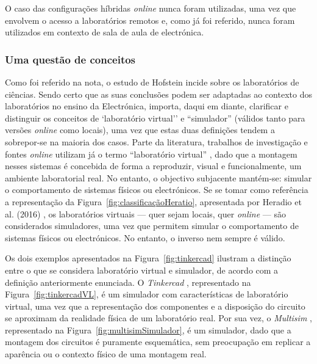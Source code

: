 O caso das configurações híbridas \textit{online} nunca foram utilizadas, uma vez que envolvem o acesso a laboratórios remotos e, como já foi referido, nunca foram utilizados  em contexto de sala de aula de electrónica.

\subsubsection{Uma questão de conceitos}
Como foi referido na nota, o estudo de Hofstein incide sobre os laboratórios de ciências. Sendo certo que as suas conclusões podem ser adaptadas ao contexto dos laboratórios no ensino da Electrónica, importa, daqui em diante, clarificar e distinguir os conceitos de `laboratório virtual'' e ``simulador'' (válidos tanto para versões \textit{online} como locais), uma vez que estas duas definições tendem a sobrepor-se na maioria dos casos. Parte da literatura, trabalhos de investigação e fontes \textit{online} utilizam já o termo “laboratório virtual” \cite{BRINSON2015218, virtuallabng, EMaster2024May}, dado que a montagem nesses sistemas é concebida de forma a reproduzir, visual e funcionalmente, um ambiente laboratorial real. No entanto, o objectivo subjacente mantém-se: simular o comportamento de sistemas físicos ou electrónicos. Se se tomar como referência a representação da Figura~\ref{fig:classificaçãoHeratio}, apresentada por Heradio et al. (2016) \cite{HERADIO20161}, os laboratórios virtuais — quer sejam locais, quer \textit{online} — são considerados simuladores, uma vez que permitem simular o comportamento de sistemas físicos ou electrónicos. No entanto, o inverso nem sempre é válido.

Os dois exemplos apresentados na Figura~\ref{fig:tinkercad} ilustram a distinção entre o que se considera laboratório virtual e simulador, de acordo com a definição anteriormente enunciada. O \textit{Tinkercad} \cite{tinkercad}, representado na Figura~\ref{fig:tinkercadVL}, é um simulador com características de laboratório virtual, uma vez que a representação dos componentes e a disposição do circuito se aproximam da realidade física de um laboratório real. Por sua vez, o \textit{Multisim} \cite{multisim}, representado na Figura~\ref{fig:multisimSimulador}, é um simulador, dado que a montagem dos circuitos é puramente esquemática, sem preocupação em replicar a aparência ou o contexto físico de uma montagem real.


